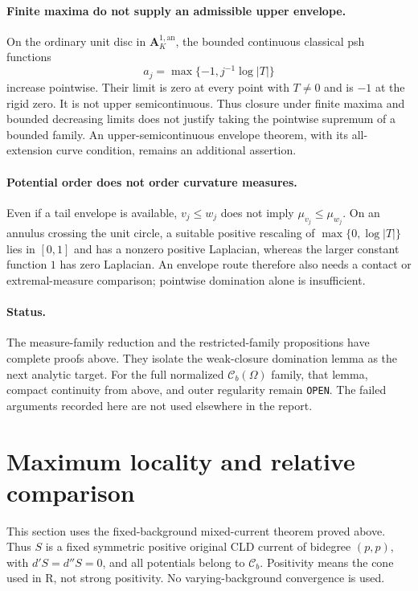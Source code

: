 \documentclass[11pt,a4paper]{article}
\numberwithin{equation}{section}
\theoremstyle{definition}
\theoremstyle{remark}
\newcommand{\Cb}{\mathcal C_b}
\begin{document}
\paragraph{Finite maxima do not supply an admissible upper envelope.}
On the ordinary unit disc in $\mathbf A_K^{1,\mathrm{an}}$, the
bounded continuous classical psh functions
\[
 a_j=\max\{-1,j^{-1}\log|T|\}
\]
increase pointwise. Their limit is zero at every point with $T\ne0$
and is $-1$ at the rigid zero. It is not upper semicontinuous.
Thus closure under finite maxima and bounded decreasing limits
does not justify taking the pointwise supremum of a bounded family.
An upper-semicontinuous envelope theorem, with its all-extension
curve condition, remains an additional assertion.

\paragraph{Potential order does not order curvature measures.}
Even if a tail envelope is available, $v_j\leq w_j$ does not imply
$\mu_{v_j}\leq\mu_{w_j}$. On an annulus crossing the unit circle,
a suitable positive rescaling of $\max\{0,\log|T|\}$ lies in
$[0,1]$ and has a nonzero positive Laplacian, whereas the larger
constant function $1$ has zero Laplacian. An envelope route therefore
also needs a contact or extremal-measure comparison; pointwise
domination alone is insufficient.

\paragraph{Status.}
The measure-family reduction and the restricted-family propositions
have complete proofs above. They isolate the weak-closure domination
lemma as the next analytic target. For the full normalized
$\Cb(\Omega)$ family, that lemma, compact continuity from above,
and outer regularity remain \texttt{OPEN}. The failed arguments
recorded here are not used elsewhere in the report.



\section{Maximum locality and relative comparison}
\label{sec:maximum-locality}

This section uses the fixed-background mixed-current theorem proved above. Thus
\(S\) is a fixed symmetric positive original CLD current of bidegree
\((p,p)\), with \(d'S=d''S=0\), and all potentials belong to
\(\mathcal C_b\). Positivity means the cone used in R, not strong positivity.
No varying-background convergence is used.
\end{document}
